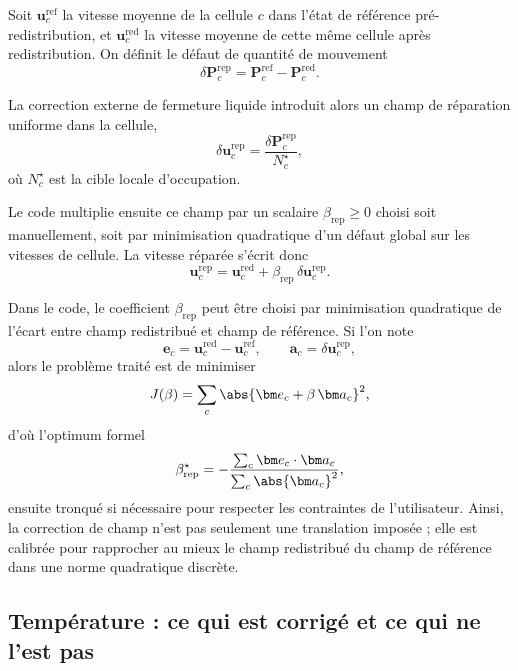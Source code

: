 \documentclass[11pt,a4paper]{article}
\begin{document}
Soit $\bm{u}_c^{\mathrm{ref}}$ la vitesse moyenne de la cellule $c$ dans l'état de référence pré-redistribution, et $\bm{u}_c^{\mathrm{red}}$ la vitesse moyenne de cette même cellule après redistribution. On définit le défaut de quantité de mouvement
\begin{equation}
 \delta \bm{P}_c^{\mathrm{rep}} = \bm{P}_c^{\mathrm{ref}} - \bm{P}_c^{\mathrm{red}}.
\end{equation}

La correction externe de fermeture liquide introduit alors un champ de réparation uniforme dans la cellule,
\begin{equation}
 \delta \bm{u}_c^{\mathrm{rep}} = \frac{\delta \bm{P}_c^{\mathrm{rep}}}{N_c^{\star}},
\end{equation}
où $N_c^{\star}$ est la cible locale d'occupation.

Le code multiplie ensuite ce champ par un scalaire $\beta_{\mathrm{rep}}\ge 0$ choisi soit manuellement, soit par minimisation quadratique d'un défaut global sur les vitesses de cellule. La vitesse réparée s'écrit donc
\begin{equation}
 \bm{u}_c^{\mathrm{rep}} = \bm{u}_c^{\mathrm{red}} + \beta_{\mathrm{rep}}\,\delta \bm{u}_c^{\mathrm{rep}}.
\end{equation}

Dans le code, le coefficient $\beta_{\mathrm{rep}}$ peut être choisi par minimisation quadratique de l'écart entre champ redistribué et champ de référence. Si l'on note
\begin{equation}
  \bm e_c = \bm u_c^{\mathrm{red}} - \bm u_c^{\mathrm{ref}},
  \qquad
  \bm a_c = \delta \bm u_c^{\mathrm{rep}},
\end{equation}
alors le problème traité est de minimiser
\begin{equation}
  J(\beta) = \sum_c \abs{\bm e_c + \beta \, \bm a_c}^2,
\end{equation}
d'où l'optimum formel
\begin{equation}
  \beta_{\mathrm{rep}}^{\star} = -\frac{\sum_c \bm e_c\cdot \bm a_c}{\sum_c \abs{\bm a_c}^2},
\end{equation}
ensuite tronqué si nécessaire pour respecter les contraintes de l'utilisateur. Ainsi, la correction de champ n'est pas seulement une translation imposée ; elle est calibrée pour rapprocher au mieux le champ redistribué du champ de référence dans une norme quadratique discrète.

\subsection{Température : ce qui est corrigé et ce qui ne l'est pas}
\end{document}
